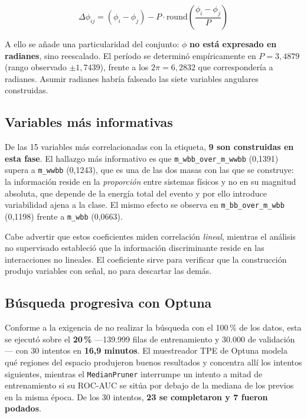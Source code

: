 \documentclass[12pt,a4paper]{article}
\begin{document}
\begin{equation}
\Delta\phi_{ij} = (\phi_i - \phi_j) - P \cdot \text{round}\!\left(\frac{\phi_i - \phi_j}{P}\right)
\label{eq:dphi}
\end{equation}

A ello se añade una particularidad del conjunto: $\phi$ \textbf{no está expresado en radianes},
sino reescalado. El período se determinó empíricamente en $P = 3{,}4879$ (rango observado
$\pm1{,}7439$), frente a los $2\pi = 6{,}2832$ que correspondería a radianes. Asumir radianes
habría falseado las siete variables angulares construidas.

\subsection{Variables más informativas}

De las 15 variables más correlacionadas con la etiqueta, \textbf{9 son construidas en esta fase}.
El hallazgo más informativo es que \texttt{m\_wbb\_over\_m\_wwbb} (0,1391) supera a
\texttt{m\_wwbb} (0,1243), que es una de las dos masas con las que se construye: la información
reside en la \emph{proporción} entre sistemas físicos y no en su magnitud absoluta, que depende de
la energía total del evento y por ello introduce variabilidad ajena a la clase. El mismo efecto se
observa en \texttt{m\_bb\_over\_m\_wbb} (0,1198) frente a \texttt{m\_wbb} (0,0663).

Cabe advertir que estos coeficientes miden correlación \emph{lineal}, mientras el análisis no
supervisado estableció que la información discriminante reside en las interacciones no lineales.
El coeficiente sirve para verificar que la construcción produjo variables con señal, no para
descartar las demás.

\subsection{Búsqueda progresiva con Optuna}

Conforme a la exigencia de no realizar la búsqueda con el 100\,\% de los datos, esta se ejecutó
sobre el \textbf{20\,\%} ---139.999 filas de entrenamiento y 30.000 de validación--- con 30
intentos en \textbf{16,9 minutos}. El muestreador TPE de Optuna \citep{optuna} modela qué regiones
del espacio produjeron buenos resultados y concentra allí los intentos siguientes, mientras el
\texttt{MedianPruner} interrumpe un intento a mitad de entrenamiento si su ROC-AUC se sitúa por
debajo de la mediana de los previos en la misma época. De los 30 intentos, \textbf{23 se
completaron y 7 fueron podados}.
\end{document}
